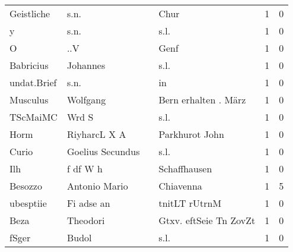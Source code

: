 \begin{tabular}{llllrr}
               Geistliche &                               s.n. &             &                                        Chur &          1 &         0 \\
                        y &                               s.n. &             &                                        s.l. &          1 &         0 \\
                        O &                                ..V &             &                                        Genf &          1 &         0 \\
                Babricius &                           Johannes &             &                                        s.l. &          1 &         0 \\
              undat.Brief &                               s.n. &             &                                          in &          1 &         0 \\
                 Musculus &                           Wolfgang &             &                        Bern erhalten . März &          1 &         0 \\
                 TScMaiMC &                              Wrd S &             &                                        s.l. &          1 &         0 \\
                     Horm &                       RiyharcL X A &             &                              Parkhurot John &          1 &         0 \\
                    Curio &                   Goelius Secundus &             &                                        s.l. &          1 &         0 \\
                      Ilh &                           f df W h &             &                                Schaffhausen &          1 &         0 \\
                  Besozzo &                      Antonio Mario &             &                                   Chiavenna &          1 &         5 \\
                ubesptiie &                         Fi adse an &             &                               tnitLT rUtrnM &          1 &         0 \\
                     Beza &                           Theodori &             &                      Gtxv. eftSeie Tn ZovZt &          1 &         0 \\
                    fSger &                              Budol &             &                                        s.l. &          1 &         0 \\

\end{tabular}
